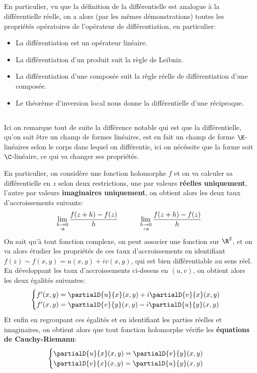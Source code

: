 \subsection*{}
En particulier, vu que la définition de la différentielle est analogue à la différentielle réelle, on a alors (par les mêmes démonstrations) toutes les propriétés opératoires de l'opérateur de différentiation, en particulier:
\begin{itemize}
   \item La différentiation est un opérateur linéaire.
   \item La différentiation d'un produit suit la règle de Leibniz.
   \item La différentiation d'une composée suit la règle réelle de différentiation d'une composée.
   \item Le théorème d'inversion local nous donne la différentielle d'une réciproque.
\end{itemize}

\subsection*{}
Ici on remarque tout de suite la différence notable qui est que la différentielle, qu'on sait être un champ de formes linéaires, est en fait un champ de forme \(\K\)-linéaires selon le corps dans lequel on différentie, ici on nécéssite que la forme soit \(\C\)-linéaire, ce qui va changer ses propriétés.\<

En particulier, on considère une fonction holomorphe \(f\) et on va calculer sa différentielle en \(z\) selon deux restrictions, une par valeurs \textbf{réelles uniquement}, l'autre par valeurs \textbf{imaginaires uniquement}, on obtient alors les deux taux d'accroissements suivants:
\[
   \lim_{h \underset{\R}{\rightarrow} 0} \frac{f(z + h) - f(z)}{h} \quad \quad \quad \lim_{h \underset{i\R}{\rightarrow} 0} \frac{f(z + h) - f(z)}{h}
\]
On sait qu'à tout fonction complexe, on peut associer une fonction sur \(\R^2\), et on va alors étudier les propriétés de ces taux d'accroissements en identifiant \(f(z) \sim f(x, y) = u(x, y) + iv(x, y)\), qui est bien différentiable au sens réel. En développant les taux d'accroissements ci-dessus en \((u, v)\), on obtient alors les deux égalités suivantes:
\[
   \begin{cases}
      f'(x, y) = \partialD{u}{x}(x, y) + i\partialD{v}{x}(x, y)\\
      f'(x, y) = \partialD{v}{y}(x, y) - i\partialD{u}{y}(x, y)
   \end{cases}
\]
Et enfin en regroupant ces égalités et en identifiant les parties réelles et imaginaires, on obtient alors que tout fonction holomorphe vérifie les \textbf{équations de Cauchy-Riemann}:
\[
   \begin{cases}
      \partialD{u}{x}(x, y) = \partialD{v}{y}(x, y)\\
      \partialD{v}{x}(x, y) = \partialD{u}{y}(x, y)
   \end{cases}
\]
\pagebreak 
